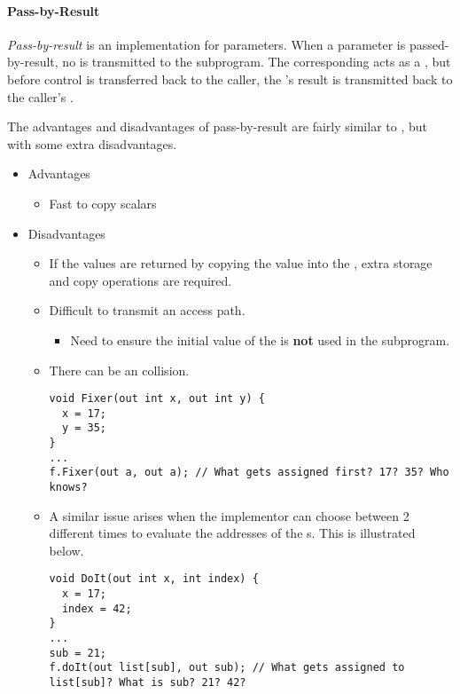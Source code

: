 \paragraph{Pass-by-Result}\label{par:Parameter_Passing-Pass_By_Result}
\begin{definition}\label{def:Pass_By_Result}
  \emph{Pass-by-result} is an implementation for  parameters.
  When a parameter is passed-by-result, no  is transmitted to the subprogram.
  The corresponding  acts as a , but before control is transferred back to the caller, the 's result is transmitted back to the caller's .

  The advantages and disadvantages of pass-by-result are fairly similar to , but with some extra disadvantages.
  \begin{itemize}[noitemsep]
  \item Advantages
    \begin{itemize}[noitemsep]
    \item Fast to copy scalars
    \end{itemize}
  \item Disadvantages
    \begin{itemize}[noitemsep]
    \item If the values are returned by copying the value into the , extra storage and copy operations are required.
    \item Difficult to transmit an access path.
      \begin{itemize}[noitemsep]
      \item Need to ensure the initial value of the  is \textbf{not} used in the subprogram.
      \end{itemize}
    \item There can be an  collision.
\begin{verbatim}
void Fixer(out int x, out int y) {
  x = 17;
  y = 35;
}
...
f.Fixer(out a, out a); // What gets assigned first? 17? 35? Who knows?
\end{verbatim}
    \item A similar issue arises when the implementor can choose between 2 different times to evaluate the addresses of the s. This is illustrated below.
\begin{verbatim}
void DoIt(out int x, int index) {
  x = 17;
  index = 42;
}
...
sub = 21;
f.doIt(out list[sub], out sub); // What gets assigned to list[sub]? What is sub? 21? 42?
\end{verbatim}
    \end{itemize}
  \end{itemize}
\end{definition}

